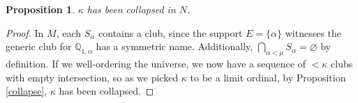 \documentclass[10pt,a4paper]{amsart}
\newtheorem{prop}{Proposition}
\newcommand{\Q}{\mathbb{Q}} %
\begin{document}
\begin{prop}\label{collapsed}
    $\kappa$ has been collapsed in $N$. 
\end{prop}

\begin{proof}
    In $M$, each $S_\alpha$ contains a club, since the support $E = \{\alpha\}$ witnesses the generic club for $\Q_{1,\alpha}$ has a symmetric name. Additionally, $\bigcap_{\alpha < \mu} S_\alpha = \varnothing$ by definition. If we  well-ordering the universe, we now have a sequence of $< \kappa$ clubs with empty intersection, so as we picked $\kappa$ to be a limit ordinal, by Proposition \ref{collapse}, $\kappa$ has been collapsed.
\end{proof}
\end{document}
